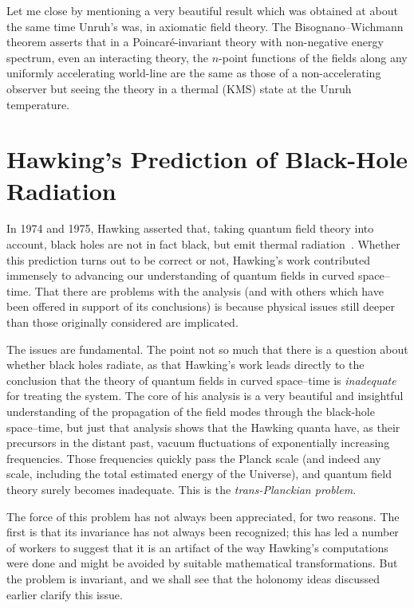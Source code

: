 \documentclass[12pt]{article}
\begin{document}
Let me close by mentioning a very beautiful result which was obtained at about the same time Unruh's was, in axiomatic field theory.  The Bisognano--Wichmann theorem \citep{Bisognano:1976za} asserts that in a Poincar\'e-invariant theory with non-negative energy spectrum, even an interacting theory, the $n$-point functions of the fields along any uniformly accelerating world-line are the same as those of a non-accelerating observer but seeing the theory in a thermal (KMS) state at the Unruh temperature.




\section{Hawking's Prediction of Black-Hole Radiation}

In 1974 and 1975, Hawking asserted that, taking quantum field theory into account, black holes are not in fact black, but emit thermal radiation~\citep{Hawking:1974rv,Hawking:1974sw}.  Whether this prediction turns out to be correct or not, Hawking's work contributed immensely to advancing our understanding of quantum fields in curved space--time.  
That there are problems with the analysis (and with others which have been offered in support of its conclusions) is because
physical issues still deeper than those originally considered are implicated.

The issues are fundamental.  The point not so much that there is a question about whether black holes radiate, as that Hawking's work leads directly to the conclusion that the theory of quantum fields in curved space--time is {\em inadequate} for treating the system. 
The core of his analysis is a very beautiful and insightful 
understanding of the propagation of the field modes through the black-hole space--time,
but just that analysis shows 
that the Hawking quanta have, as their precursors in the distant past, vacuum fluctuations of exponentially increasing frequencies.  Those frequencies quickly pass the Planck scale (and indeed any scale, including the total estimated energy of the Universe), and quantum field theory surely becomes inadequate.  This is the {\em trans-Planckian problem}.

The force of this problem has not always been appreciated, for two reasons.  The first is that its invariance has not always been recognized; this has led a number of workers to suggest that it is an artifact of the way Hawking's computations were done and might be avoided by suitable mathematical transformations.
But the problem is invariant, and 
we shall see that the holonomy ideas discussed earlier clarify this issue.  
\end{document}
